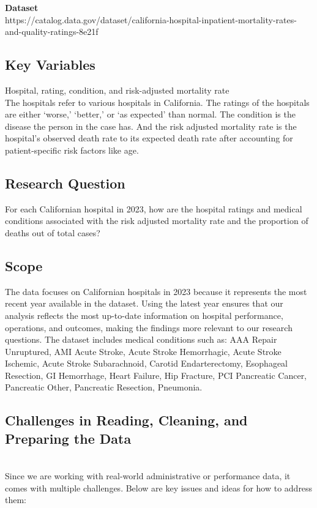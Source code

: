 \documentclass{article}
\theoremstyle{plain}
\theoremstyle{definition}
\theoremstyle{remark}
\begin{document}
\textbf{Dataset} \\ https://catalog.data.gov/dataset/california-hospital-inpatient-mortality-rates-and-quality-ratings-8e21f

\subsection{Key Variables} Hospital, rating, condition, and risk-adjusted mortality rate \\
The hospitals refer to various hospitals in California. The ratings of the hospitals are either ‘worse,’ ‘better,’ or ‘as expected’ than normal. The condition is the disease the person in the case has. And the risk adjusted mortality rate is the hospital’s observed death rate to its expected death rate after accounting for patient-specific risk factors like age.

\subsection{Research Question} For each Californian hospital in 2023, how are the hospital ratings and medical conditions associated with the risk adjusted mortality rate and the proportion of deaths out of total cases?

\subsection{Scope}
The data focuses on Californian hospitals in 2023 because it represents the most recent year available in the dataset. Using the latest year ensures that our analysis reflects the most up-to-date information on hospital performance, operations, and outcomes, making the findings more relevant to our research questions.
The dataset includes medical conditions such as: AAA Repair Unruptured, AMI Acute Stroke, Acute Stroke Hemorrhagic, Acute Stroke Ischemic, Acute Stroke Subarachnoid, Carotid Endarterectomy, Esophageal Resection, GI Hemorrhage, Heart Failure, Hip Fracture, PCI Pancreatic Cancer, Pancreatic Other, Pancreatic Resection, Pneumonia. 

\subsection{Challenges in Reading, Cleaning, and Preparing the Data}

\\Since we are working with real-world administrative or performance data, it comes with multiple challenges. Below are key issues and ideas for how to address them:
\end{document}
